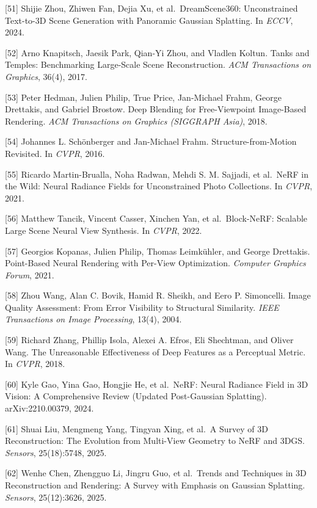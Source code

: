 {[}51{]} Shijie Zhou, Zhiwen Fan, Dejia Xu, et al.~DreamScene360: Unconstrained Text-to-3D Scene Generation with Panoramic Gaussian Splatting. In \emph{ECCV}, 2024.

{[}52{]} Arno Knapitsch, Jaesik Park, Qian-Yi Zhou, and Vladlen Koltun. Tanks and Temples: Benchmarking Large-Scale Scene Reconstruction. \emph{ACM Transactions on Graphics}, 36(4), 2017.

{[}53{]} Peter Hedman, Julien Philip, True Price, Jan-Michael Frahm, George Drettakis, and Gabriel Brostow. Deep Blending for Free-Viewpoint Image-Based Rendering. \emph{ACM Transactions on Graphics (SIGGRAPH Asia)}, 2018.

{[}54{]} Johannes L. Schönberger and Jan-Michael Frahm. Structure-from-Motion Revisited. In \emph{CVPR}, 2016.

{[}55{]} Ricardo Martin-Brualla, Noha Radwan, Mehdi S. M. Sajjadi, et al.~NeRF in the Wild: Neural Radiance Fields for Unconstrained Photo Collections. In \emph{CVPR}, 2021.

{[}56{]} Matthew Tancik, Vincent Casser, Xinchen Yan, et al.~Block-NeRF: Scalable Large Scene Neural View Synthesis. In \emph{CVPR}, 2022.

{[}57{]} Georgios Kopanas, Julien Philip, Thomas Leimkühler, and George Drettakis. Point-Based Neural Rendering with Per-View Optimization. \emph{Computer Graphics Forum}, 2021.

{[}58{]} Zhou Wang, Alan C. Bovik, Hamid R. Sheikh, and Eero P. Simoncelli. Image Quality Assessment: From Error Visibility to Structural Similarity. \emph{IEEE Transactions on Image Processing}, 13(4), 2004.

{[}59{]} Richard Zhang, Phillip Isola, Alexei A. Efros, Eli Shechtman, and Oliver Wang. The Unreasonable Effectiveness of Deep Features as a Perceptual Metric. In \emph{CVPR}, 2018.

{[}60{]} Kyle Gao, Yina Gao, Hongjie He, et al.~NeRF: Neural Radiance Field in 3D Vision: A Comprehensive Review (Updated Post-Gaussian Splatting). arXiv:2210.00379, 2024.

{[}61{]} Shuai Liu, Mengmeng Yang, Tingyan Xing, et al.~A Survey of 3D Reconstruction: The Evolution from Multi-View Geometry to NeRF and 3DGS. \emph{Sensors}, 25(18):5748, 2025.

{[}62{]} Wenhe Chen, Zhengguo Li, Jingru Guo, et al.~Trends and Techniques in 3D Reconstruction and Rendering: A Survey with Emphasis on Gaussian Splatting. \emph{Sensors}, 25(12):3626, 2025.


